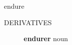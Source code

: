 \documentclass[avery5372, grid]{flashcards}
\begin{document}
\begin{flashcard}[{\B 7 Habits} {\S 词汇}]{\Huge endure}
\begin{description}
			
			
			
			
			
			
			
			
		\item[\textsc{DERIVATIVES}] \textbf{en\textbullet dur\textbullet er} noun
	\end{description}
\end{flashcard}







				
\end{document}
